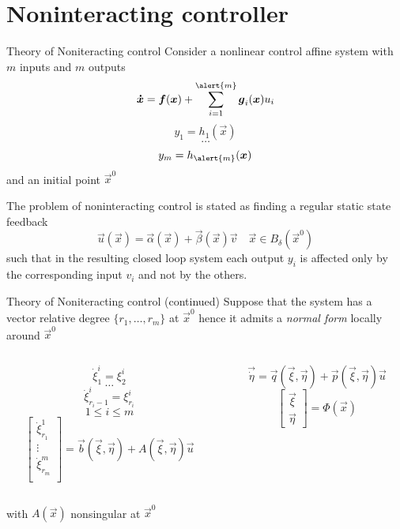 \section{Noninteracting controller}

\begin{frame}[shrink=10]{Theory of Noniteracting control}
  Consider a nonlinear control affine system with $m$ inputs and $m$ outputs
  \[
  \vec{\dot{x}} = \vec{f}(\vec{x}) + \sum\limits_{i=1}^{\alert{m}} \vec{g}_{i}(\vec{x}) u_{i}
  \]
  \[
  y_{1} = h_{1}(\vec{x})
  \]
  \[
  \hdots
  \]
  \[
  y_{m} = h_{\alert{m}}(\vec{x})
  \]
  and an initial point $\vec{x}^{0}$
  \par
  The problem of noninteracting control is stated as finding a regular static state feedback
  \[
  \vec{u}(\vec{x})  = \vec{\alpha}(\vec{x}) + \vec{\beta}(\vec{x}) \vec{v} \quad \vec{x} \in B_{\delta}(\vec{x}^0)
  \]
  such that in the resulting closed loop system each output $y_i$ is affected
  only by the corresponding input $v_i$ and not by the others.
\end{frame}

\begin{frame}{Theory of Noniteracting control (continued)}
  Suppose that the system has a vector relative degree $\{r_1, \hdots, r_m\}$ at $\vec{x}^{0}$ hence it admits
  a \emph{normal form} locally around $\vec{x}^{0}$
  \begin{columns}[t]
    \begin{column}{0.5\textwidth}
      \[
      \dot{\xi}_{1}^{i} = \xi_{2}^{i}
      \]
      \[
      \hdots
      \]
      \[
      \dot{\xi}_{r_{i}-1}^{i} = \xi_{r_{i}}^{i}
      \]
      \[
      1 \le i \le m
      \]
      \[
      \begin{bmatrix}
        \dot{\xi}_{r_{1}}^{1}\\
        \vdots\\
        \dot{\xi}_{r_{m}}^{m}\\
      \end{bmatrix}=
      \vec{b}(\vec{\xi},\vec{\eta}) + A(\vec{\xi},\vec{\eta})\vec{u}
      \]
    \end{column}
    \begin{column}{0.5\textwidth}
      \[
      \vec{\dot{\eta}} = \vec{q}(\vec{\xi},\vec{\eta}) + \vec{p}(\vec{\xi},\vec{\eta})\vec{u}
      \]
      \vskip0.3in
      \[
      \begin{bmatrix}
        \vec{\xi}\\
        \vec{\eta}
      \end{bmatrix} = 
      \Phi(\vec{x})
      \]
    \end{column}
  \end{columns}
  \centering
  with $A(\vec{x})$ nonsingular at $\vec{x}^{0}$
\end{frame}

